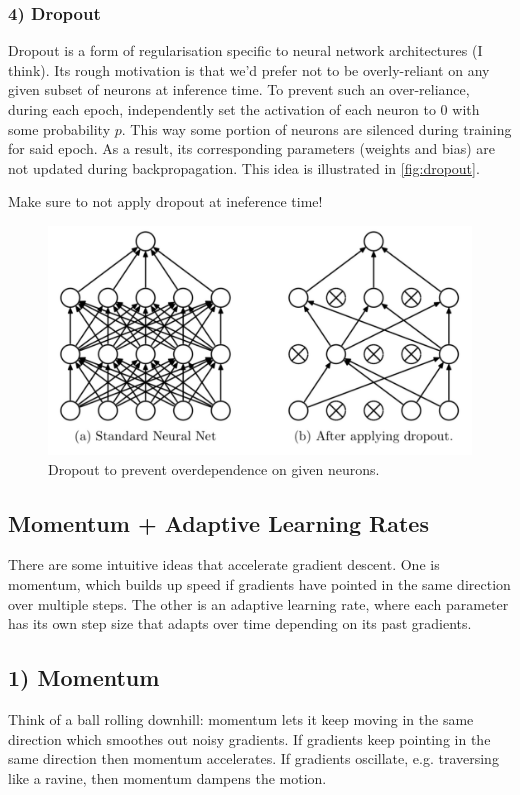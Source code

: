 \documentclass[11pt]{article}
\begin{document}
\subsubsection*{4) Dropout} Dropout is a form of regularisation specific to neural network architectures (I think). Its rough motivation is that we'd prefer not to be overly-reliant on any given subset of neurons at inference time. To prevent such an over-reliance, during each epoch, independently set the activation of each neuron to 0 with some probability $p$. This way some portion of neurons are silenced during training for said epoch. As a result, its corresponding parameters (weights and bias) are not updated during backpropagation. This idea is illustrated in \autoref{fig:dropout}.

Make sure to not apply dropout at ineference time!

\begin{figure}[t]
    \centering
    \includegraphics[width=\textwidth]{./figures/neural_nets/REG_dropout.png}
    \caption{Dropout to prevent overdependence on given neurons. }
    \label{fig:dropout}
\end{figure}

\subsection{Momentum + Adaptive Learning Rates}
There are some intuitive ideas that accelerate gradient descent. One is momentum, which builds up speed if gradients have pointed in the same direction over multiple steps. The other is an adaptive learning rate, where each parameter has its own step size that adapts over time depending on its past gradients.

\subsection*{1) Momentum}
Think of a ball rolling downhill: momentum lets it keep moving in the same direction which smoothes out noisy gradients. If gradients keep pointing in the same direction then momentum accelerates. If gradients oscillate, e.g. traversing like a ravine, then momentum dampens the motion.
\end{document}
